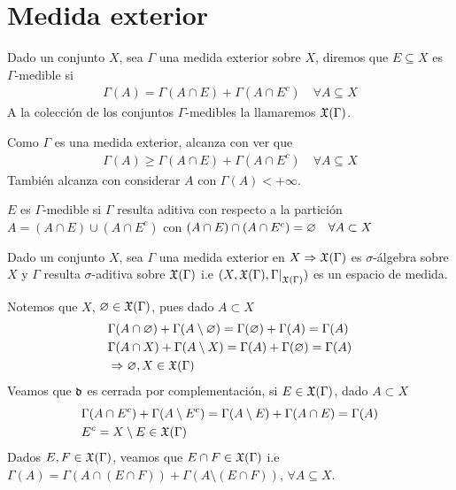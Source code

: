 \section{Medida exterior}

\begin{definition}
    Dado un conjunto $X$, sea $\Gamma$ una medida exterior sobre $X$, diremos que $E \subseteq X$ es $\Gamma$-medible si \begin{align*}
        \Gamma(A) = \Gamma(A \cap E) + \Gamma(A \cap E^c) \quad \forall A \subseteq X
    \end{align*}
    A la colección de los conjuntos $\Gamma$-medibles la llamaremos $\mathfrak{X}(\Gamma)$.
\end{definition}

\begin{note}
    Como $\Gamma$ es una medida exterior, alcanza con ver que \begin{align*}
        \Gamma(A) \geq \Gamma(A \cap E) + \Gamma(A \cap E^c) \quad \forall A \subseteq X
    \end{align*}
    También alcanza con considerar $A$ con $\Gamma(A) < +\infty$.
\end{note}

\begin{note}
    $E$ es $\Gamma$-medible si $\Gamma$ resulta aditiva con respecto a la partición $A = (A \cap E) \cup (A \cap E^c)$ con $(A\cap E) \cap (A \cap E^c) = \varnothing \quad \forall A \subset X$
\end{note}

\begin{theorem}[Carathéodory]
    Dado un conjunto $X$, sea $\Gamma$ una medida exterior en $X \Rightarrow \mathfrak{X}(\Gamma)$ es $\sigma$-álgebra sobre $X$ y $\Gamma$ resulta
    $\sigma$-aditiva sobre $\mathfrak{X}(\Gamma)$ i.e $(X, \mf{X}(\Gamma), \restr{\Gamma}{\mf{X}(\Gamma)})$ es un espacio de medida.
\end{theorem}

Notemos que $X$, $\varnothing \in \mathfrak{X}(\Gamma)$, pues dado $A \subset X$ \begin{align*}
     & \Gamma(A \cap \varnothing) + \Gamma(A \setminus \varnothing) = \Gamma(\varnothing) + \Gamma(A) = \Gamma(A) \\
     & \Gamma(A \cap X) + \Gamma(A \setminus X) = \Gamma(A) + \Gamma(\varnothing) = \Gamma(A)   \\
     & \Rightarrow \varnothing, X \in \mathfrak{X}(\Gamma)
\end{align*}
Veamos que $\mathfrak{\Gamma}$ es cerrada por complementación, si $E \in \mathfrak{X}(\Gamma)$, dado $A \subset X$ \begin{align*}
     & \Gamma(A \cap E^c) + \Gamma(A \setminus E^c) = \Gamma(A \setminus E) + \Gamma(A \cap E) = \Gamma(A) \\
     & E^c = X \setminus E \in \mathfrak{X}(\Gamma)
\end{align*}
Dados $E, F \in \mathfrak{X}(\Gamma)$, veamos que $E \cap F \in \mathfrak{X}(\Gamma)$ i.e $\Gamma(A) = \Gamma(A \cap (E \cap F)) + \Gamma(A \setminus (E \cap F)) \text{, } \forall A \subseteq X$.

